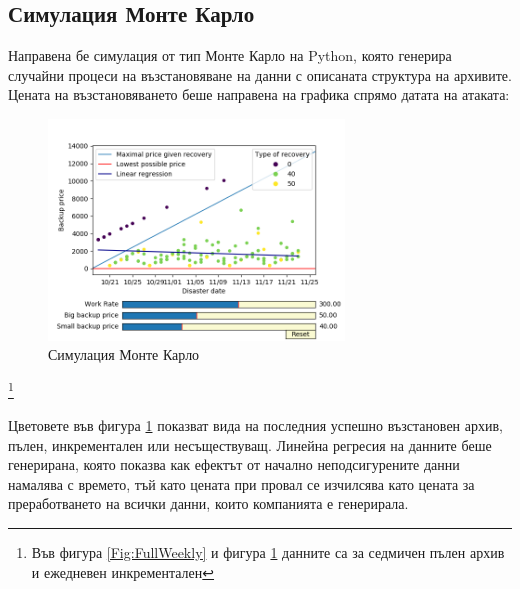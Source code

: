 \documentclass[11pt, a4paper]{article}
\theoremstyle{definition}
\newcommand\blfootnote[1]{%
	\begingroup
	\renewcommand\thefootnote{}\footnote{#1}%
	\addtocounter{footnote}{-1}%
	\endgroup
}
\begin{document}
			\subsection{Симулация Монте Карло}
				Направена бе симулация от тип Монте Карло на Python, която генерира случайни процеси на възстановяване на данни с описаната структура на архивите. Цената на възстановяването беше направена на графика спрямо датата на атаката:
				\begin{figure}[H]
					\begin{minipage}{1.0\textwidth}
						\centering
						\includegraphics[width=0.7\textwidth]{Weekly_full_carlo.png}
						\caption{Симулация Монте Карло}\label{Fig:MonteCarlo}
					\end{minipage}
				\end{figure}
				\blfootnote{Във фигура \ref{Fig:FullWeekly} и фигура \ref{Fig:MonteCarlo} данните са за седмичен пълен архив и ежедневен инкрементален}
				Цветовете във фигура \ref{Fig:MonteCarlo} показват вида на последния успешно възстановен архив, пълен, инкрементален или несъществуващ.
				\newpage
				Линейна регресия на данните беше генерирана, която показва как ефектът от начално неподсигурените данни намалява с времето, тъй като цената при провал се изчилсява като цената за преработването на всички данни, които компанията е генерирала.
\end{document}
